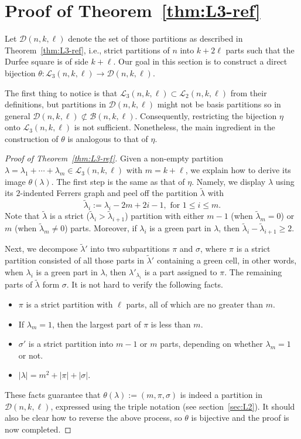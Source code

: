 \documentclass[11pt,reqno]{amsart}
\numberwithin{equation}{section}
\theoremstyle{plain}
\theoremstyle{definition}
\newcommand{\B}{\mathcal{B}}
\newcommand{\D}{\mathcal{D}}
\renewcommand{\L}{\mathcal{L}}
\begin{document}
\section{Proof of Theorem~\ref{thm:L3-ref}}\label{sec:L3}

Let $\D(n,k,\ell)$ denote the set of those partitions as described in Theorem~\ref{thm:L3-ref}, i.e., strict partitions of $n$ into $k+2\ell$ parts such that the Durfee square is of side $k+\ell$. Our goal in this section is to construct a direct bijection $\theta:\L_3(n,k,\ell)\to\D(n,k,\ell)$. 

The first thing to notice is that $\L_3(n,k,\ell)\subset \L_2(n,k,\ell)$ from their definitions, but partitions in $\D(n,k,\ell)$ might not be basis partitions so in general $\D(n,k,\ell)\not\subset\B(n,k,\ell)$. Consequently, restricting the bijection $\eta$ onto $\L_3(n,k,\ell)$ is not sufficient. Nonetheless, the main ingredient in the construction of $\theta$ is analogous to that of $\eta$.

\begin{proof}[Proof of Theorem~\ref{thm:L3-ref}]
Given a non-empty partition $\lambda=\lambda_1+\cdots+\lambda_{m}\in\L_3(n,k,\ell)$ with $m=k+\ell$, we explain how to derive its image $\theta(\lambda)$. The first step is the same as that of $\eta$. Namely, we display $\lambda$ using its $2$-indented Ferrers graph and peel off the partition $\tilde{\lambda}$ with
$$\tilde{\lambda}_i:=\lambda_i-2m+2i-1,\text{ for }1\le i\le m.$$
Note that $\tilde{\lambda}$ is a strict ($\tilde{\lambda}_i>\tilde{\lambda}_{i+1}$) partition with either $m-1$ (when $\tilde{\lambda}_{m}=0$) or $m$ (when $\tilde{\lambda}_{m}\neq 0$) parts. Moreover, if $\lambda_i$ is a green part in $\lambda$, then $\tilde{\lambda}_i-\tilde{\lambda}_{i+1}\ge 2$.

Next, we decompose $\tilde{\lambda}'$ into two subpartitions $\pi$ and $\sigma$, where $\pi$ is a strict partition consisted of all those parts in $\tilde{\lambda}'$ containing a green cell, in other words, when $\lambda_i$ is a green part in $\lambda$, then $\lambda'_{\lambda_i}$ is a part assigned to $\pi$. The remaining parts of $\tilde{\lambda}$ form $\sigma$. It is not hard to verify the following facts.
\begin{itemize}
  \item $\pi$ is a strict partition with $\ell$ parts, all of which are no greater than $m$.
  \item If $\lambda_m=1$, then the largest part of $\pi$ is less than $m$.
  \item $\sigma'$ is a strict partition into $m-1$ or $m$ parts, depending on whether $\lambda_m=1$ or not.
  \item $|\lambda|=m^2+|\pi|+|\sigma|$.
\end{itemize}
These facts guarantee that $\theta(\lambda):=(m,\pi,\sigma)$ is indeed a partition in $\D(n,k,\ell)$, expressed using the triple notation (see section~\ref{sec:L2}). It should also be clear how to reverse the above process, so $\theta$ is bijective and the proof is now completed.
\end{proof} 
\end{document}
